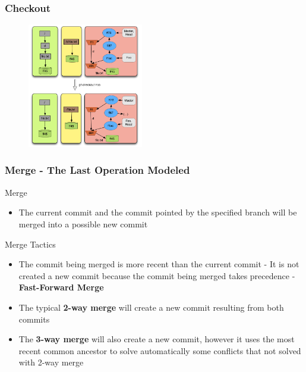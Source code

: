\documentclass{beamer}
\begin{document}
\begin{frame}[fragile]
   \frametitle{Checkout}
   \begin{figure}
      \centering
      \includegraphics[width=0.45\textwidth]{images/checkout.png}
   \end{figure}
\end{frame}

\begin{frame}
	\frametitle{Merge - The Last Operation Modeled}
	\begin{block}{Merge}
	   \begin{itemize}
	      \item The current commit and the commit pointed by the specified branch
	      will be merged into a possible new commit
	   \end{itemize}
	\end{block}
	\small
   \begin{block}{Merge Tactics}
	   \begin{itemize}
		   \item The commit being merged is more recent than
		   the current commit - It is not created a new commit because the
         commit being merged takes precedence - \textbf{Fast-Forward Merge}
		   \item The typical \textbf{2-way merge} will create a new commit
		   resulting from both commits
		   \item The \textbf{3-way merge} will also create a new commit, however 
         it uses the most recent common ancestor to solve automatically 
         some conflicts that not solved with 2-way merge
	\end{itemize}
	\end{block}
\end{frame}
\end{document}
